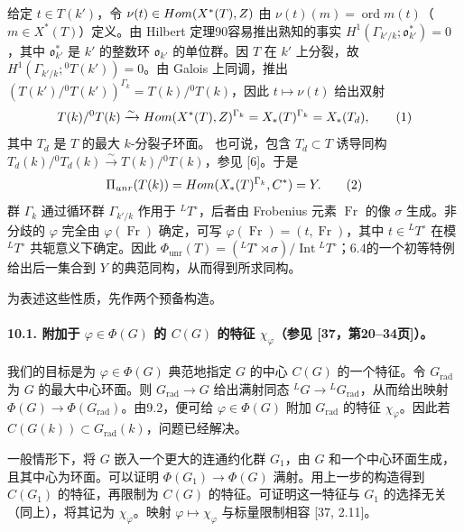 给定 $t\in T(k')$，令 $\nu(t)\in Hom(X^*(T),Z)$ 由 $\nu(t)(m)=\operatorname{ord}m(t)$（$m\in X^*(T)$）定义。由 Hilbert 定理90容易推出熟知的事实 $H^1(\Gamma_{k'/k};\mathfrak o_{k'}^*)=0$，其中 $\mathfrak o_{k'}^*$ 是 $k'$ 的整数环 $\mathfrak o_{k'}$ 的单位群。因 $T$ 在 $k'$ 上分裂，故 $H^1(\Gamma_{k'/k};{}^0T(k'))=0$。由 Galois 上同调，推出 $(T(k')/{}^0T(k'))^{\Gamma_k}=T(k)/{}^0T(k)$，因此 $t\mapsto\nu(t)$ 给出双射
\begin{equation}
 T(k)/{}^0T(k)\xrightarrow{\sim}Hom(X^*(T),Z)^{\Gamma_k}
 =X_*(T)^{\Gamma_k}=X_*(T_d),\tag{1}
\end{equation}
其中 $T_d$ 是 $T$ 的最大 $k$-分裂子环面。
也可说，包含 $T_d\subset T$ 诱导同构 $T_d(k)/{}^0T_d(k)\xrightarrow{\sim}T(k)/{}^0T(k)$，参见 [6]。于是
\begin{equation}
 \Pi_{unr}(T(k))=Hom(X_*(T)^{\Gamma_k},C^*)=Y.\tag{2}
\end{equation}
群 $\Gamma_k$ 通过循环群 $\Gamma_{k'/k}$ 作用于 ${}^LT^\circ$，后者由 Frobenius 元素 $\operatorname{Fr}$ 的像 $\sigma$ 生成。非分歧的 $\varphi$ 完全由 $\varphi(\operatorname{Fr})$ 确定，可写 $\varphi(\operatorname{Fr})=(t,\operatorname{Fr})$，其中 $t\in{}^LT^\circ$ 在模 ${}^LT^\circ$ 共轭意义下确定。因此 $\Phi_{\mathrm{unr}}(T)=({}^LT^\circ\rtimes\sigma)/\operatorname{Int}{}^LT^\circ$；6.4的一个初等特例给出后一集合到 $Y$ 的典范同构，从而得到所求同构。

为表述这些性质，先作两个预备构造。

\paragraph*{10.1. 附加于 $\varphi\in\Phi(G)$ 的 $C(G)$ 的特征 $\chi_\varphi$（参见 [37，第20--34页]）。}
我们的目标是为 $\varphi\in\Phi(G)$ 典范地指定 $G$ 的中心 $C(G)$ 的一个特征。令 $G_{\mathrm{rad}}$ 为 $G$ 的最大中心环面。则 $G_{\mathrm{rad}}\to G$ 给出满射同态 ${}^LG\to{}^LG_{\mathrm{rad}}$，从而给出映射 $\Phi(G)\to\Phi(G_{\mathrm{rad}})$。由9.2，便可给 $\varphi\in\Phi(G)$ 附加 $G_{\mathrm{rad}}$ 的特征 $\chi_\varphi$。因此若 $C(G(k))\subset G_{\mathrm{rad}}(k)$，问题已经解决。

一般情形下，将 $G$ 嵌入一个更大的连通约化群 $G_1$，由 $G$ 和一个中心环面生成，且其中心为环面。可以证明 $\Phi(G_1)\to\Phi(G)$ 满射。用上一步的构造得到 $C(G_1)$ 的特征，再限制为 $C(G)$ 的特征。可证明这一特征与 $G_1$ 的选择无关（同上），将其记为 $\chi_\varphi$。映射 $\varphi\mapsto\chi_\varphi$ 与标量限制相容 [37, 2.11]。

